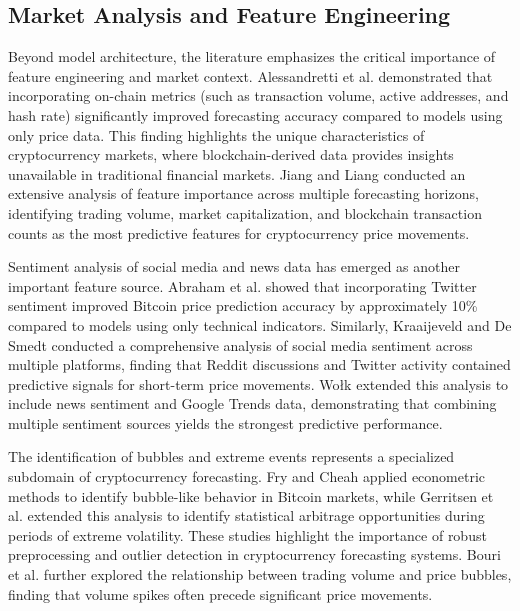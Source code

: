 \documentclass[conference]{IEEEtran}
\begin{document}
\subsection{Market Analysis and Feature Engineering}

Beyond model architecture, the literature emphasizes the critical importance of feature engineering and market context. Alessandretti et al. \cite{alessandretti2018} demonstrated that incorporating on-chain metrics (such as transaction volume, active addresses, and hash rate) significantly improved forecasting accuracy compared to models using only price data. This finding highlights the unique characteristics of cryptocurrency markets, where blockchain-derived data provides insights unavailable in traditional financial markets. Jiang and Liang \cite{jiang2021} conducted an extensive analysis of feature importance across multiple forecasting horizons, identifying trading volume, market capitalization, and blockchain transaction counts as the most predictive features for cryptocurrency price movements.

Sentiment analysis of social media and news data has emerged as another important feature source. Abraham et al. \cite{abraham2018} showed that incorporating Twitter sentiment improved Bitcoin price prediction accuracy by approximately 10\% compared to models using only technical indicators. Similarly, Kraaijeveld and De Smedt \cite{kraaijeveld2020} conducted a comprehensive analysis of social media sentiment across multiple platforms, finding that Reddit discussions and Twitter activity contained predictive signals for short-term price movements. Wołk \cite{wolk2020} extended this analysis to include news sentiment and Google Trends data, demonstrating that combining multiple sentiment sources yields the strongest predictive performance.

The identification of bubbles and extreme events represents a specialized subdomain of cryptocurrency forecasting. Fry and Cheah \cite{fry2016} applied econometric methods to identify bubble-like behavior in Bitcoin markets, while Gerritsen et al. \cite{gerritsen2020} extended this analysis to identify statistical arbitrage opportunities during periods of extreme volatility. These studies highlight the importance of robust preprocessing and outlier detection in cryptocurrency forecasting systems. Bouri et al. \cite{bouri2019} further explored the relationship between trading volume and price bubbles, finding that volume spikes often precede significant price movements.
\end{document}
